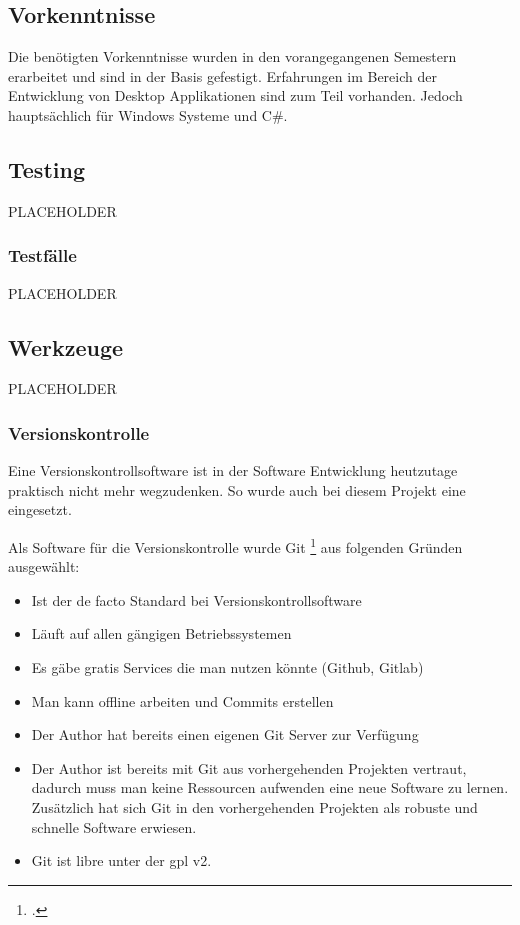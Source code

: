 \subsection{Vorkenntnisse}
\label{sec:org9e04095}

Die benötigten Vorkenntnisse wurden in den vorangegangenen Semestern erarbeitet
und sind in der Basis gefestigt. Erfahrungen im Bereich der Entwicklung von
Desktop Applikationen sind zum Teil vorhanden. Jedoch hauptsächlich für Windows
Systeme und C\#.

\subsection{Testing}
\label{sec:org76a0fb9}

PLACEHOLDER

\subsubsection{Testfälle}
\label{sec:orgbfae27e}

PLACEHOLDER

\subsection{Werkzeuge}
\label{sec:org59ef66e}

PLACEHOLDER

\subsubsection{Versionskontrolle}
\label{sec:org28d9476}

Eine Versionskontrollsoftware ist in der Software Entwicklung heutzutage
praktisch nicht mehr wegzudenken. So wurde auch bei diesem Projekt eine
eingesetzt.

Als Software für die Versionskontrolle wurde Git \footcite{git} aus folgenden
Gründen ausgewählt:

\begin{itemize}
\item Ist der de facto Standard bei Versionskontrollsoftware
\item Läuft auf allen gängigen Betriebssystemen
\item Es gäbe gratis Services die man nutzen könnte (Github, Gitlab)
\item Man kann offline arbeiten und Commits erstellen
\item Der Author hat bereits einen eigenen Git Server zur Verfügung
\item Der Author ist bereits mit Git aus vorhergehenden Projekten vertraut,
dadurch muss man keine Ressourcen aufwenden eine neue Software zu lernen.
Zusätzlich hat sich Git in den vorhergehenden Projekten als robuste
und schnelle Software erwiesen.
\item Git ist \gls{libre} unter der \gls{gpl} v2.
\end{itemize}

